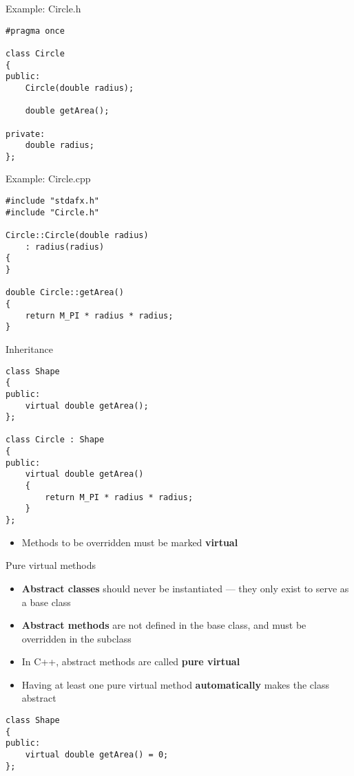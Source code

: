 \begin{frame}[fragile]{Example: Circle.h}
    \begin{lstlisting}
#pragma once

class Circle
{
public:
    Circle(double radius);
    
    double getArea();

private:
    double radius;
};
    \end{lstlisting}
\end{frame}

\begin{frame}[fragile]{Example: Circle.cpp}
    \begin{lstlisting}
#include "stdafx.h"
#include "Circle.h"

Circle::Circle(double radius)
    : radius(radius)
{
}

double Circle::getArea()
{
    return M_PI * radius * radius;
}
    \end{lstlisting}
\end{frame}

\begin{frame}[fragile]{Inheritance}
    \begin{lstlisting}
class Shape
{
public:
    virtual double getArea();
};

class Circle : Shape
{
public:
    virtual double getArea()
    {
        return M_PI * radius * radius;
    }
};
    \end{lstlisting}
    \begin{itemize}
        \item Methods to be overridden must be marked \textbf{virtual}
    \end{itemize}
\end{frame}

\begin{frame}[fragile]{Pure virtual methods}
    \begin{itemize}
        \item \textbf{Abstract classes} should never be instantiated --- they only exist to serve as a base class
        \item \textbf{Abstract methods} are not defined in the base class, and must be overridden in the subclass
        \item In C++, abstract methods are called \textbf{pure virtual}
        \item Having at least one pure virtual method \textbf{automatically} makes the class abstract
    \end{itemize}
    \begin{lstlisting}
class Shape
{
public:
    virtual double getArea() = 0;
};
    \end{lstlisting}
\end{frame}

